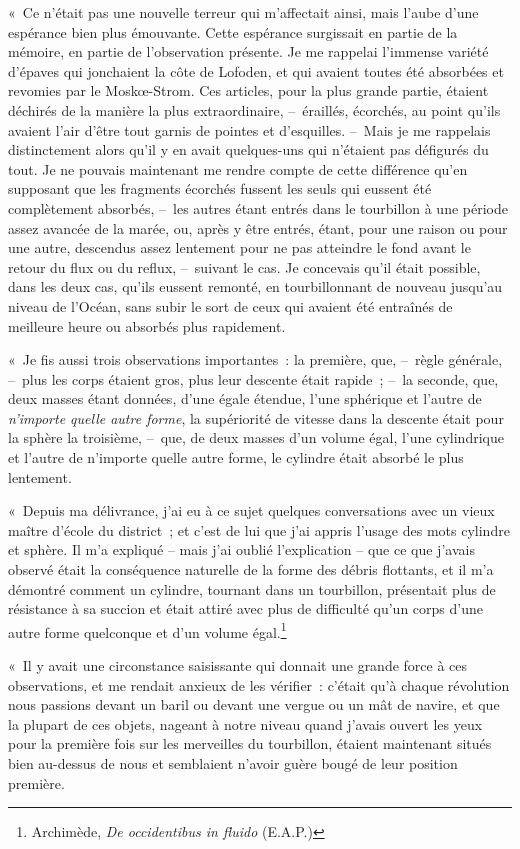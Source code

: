 \documentclass[french,twoside]{book} %
\begin{document}
« Ce n’était pas une nouvelle terreur qui m’affectait ainsi, mais l’aube d’une espérance bien plus émouvante. Cette espérance surgissait en partie de la mémoire, en partie de l’observation présente. Je me rappelai l’immense variété d’épaves qui jonchaient la côte de Lofoden, et qui avaient toutes été absorbées et revomies par le Moskœ-Strom. Ces articles, pour la plus grande partie, étaient déchirés de la manière la plus extraordinaire, – éraillés, écorchés, au point qu’ils avaient l’air d’être tout garnis de pointes et d’esquilles. – Mais je me rappelais distinctement alors qu’il y en avait quelques-uns qui n’étaient pas défigurés du tout. Je ne pouvais maintenant me rendre compte de cette différence qu’en supposant que les fragments écorchés fussent les seuls qui eussent été complètement absorbés, – les autres étant entrés dans le tourbillon à une période assez avancée de la marée, ou, après y être entrés, étant, pour une raison ou pour une autre, descendus assez lentement pour ne pas atteindre le fond avant le retour du flux ou du reflux, – suivant le cas. Je concevais qu’il était possible, dans les deux cas, qu’ils eussent remonté, en tourbillonnant de nouveau jusqu’au niveau de l’Océan, sans subir le sort de ceux qui avaient été entraînés de meilleure heure ou absorbés plus rapidement.\par
« Je fis aussi trois observations importantes : la première, que, – règle générale, – plus les corps étaient gros, plus leur descente était rapide ; – la seconde, que, deux masses étant données, d’une égale étendue, l’une sphérique et l’autre de \emph{n’importe quelle autre forme}, la supériorité de vitesse dans la descente était pour la sphère la troisième, – que, de deux masses d’un volume égal, l’une cylindrique et l’autre de n’importe quelle autre forme, le cylindre était absorbé le plus lentement.\par
« Depuis ma délivrance, j’ai eu à ce sujet quelques conversations avec un vieux maître d’école du district ; et c’est de lui que j’ai appris l’usage des mots cylindre et sphère. Il m’a expliqué – mais j’ai oublié l’explication – que ce que j’avais observé était la conséquence naturelle de la forme des débris flottants, et il m’a démontré comment un cylindre, tournant dans un tourbillon, présentait plus de résistance à sa succion et était attiré avec plus de difficulté qu’un corps d’une autre forme quelconque et d’un volume égal.\footnote{Archimède, \emph{De occidentibus in fluido} (E.A.P.)}\par
« Il y avait une circonstance saisissante qui donnait une grande force à ces observations, et me rendait anxieux de les vérifier : c’était qu’à chaque révolution nous passions devant un baril ou devant une vergue ou un mât de navire, et que la plupart de ces objets, nageant à notre niveau quand j’avais ouvert les yeux pour la première fois sur les merveilles du tourbillon, étaient maintenant situés bien au-dessus de nous et semblaient n’avoir guère bougé de leur position première.\par
\end{document}
